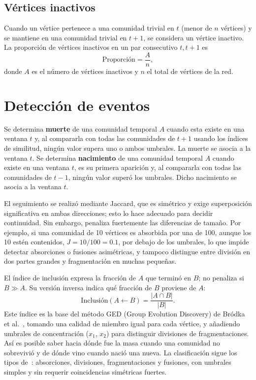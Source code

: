 \documentclass[12pt]{article}
\begin{document}
\subsection{Vértices inactivos}
Cuando un vértice pertenece a una comunidad trivial en $t$ (menor de $n$ vértices) y se mantiene en una comunidad trivial en $t+1$, se considera un vértice inactivo. La proporción de vértices inactivos en un par consecutivo $t, t+1$ es
\begin{equation}
\text{Proporción} = \frac{A}{n},
\end{equation}
donde $A$ es el número de vértices inactivos y $n$ el total de vértices de la red.

\section{Detección de eventos}
\label{sec:eventos}

Se determina \textbf{muerte} de una comunidad temporal $A$ cuando esta existe en una ventana $t$ y, al compararla con todas las comunidades de $t+1$ usando los índices de similitud, ningún valor supera uno o ambos umbrales. La muerte se asocia a la ventana $t$. Se determina \textbf{nacimiento} de una comunidad temporal $A$ cuando existe en una ventana $t$, es su primera aparición y, al compararla con todas las comunidades de $t-1$, ningún valor superó los umbrales. Dicho nacimiento se asocia a la ventana $t$.

El seguimiento se realizó mediante Jaccard, que es simétrico y exige superposición significativa en ambas direcciones; esto lo hace adecuado para decidir continuidad. Sin embargo, penaliza fuertemente las diferencias de tamaño. Por ejemplo, si una comunidad de 10 vértices es absorbida por una de 100, aunque los 10 estén contenidos, $J = 10/100 = 0.1$, por debajo de los umbrales, lo que impide detectar absorciones o fusiones asimétricas, y tampoco distingue entre división en dos partes grandes y fragmentación en muchas pequeñas.

El índice de inclusión expresa la fracción de $A$ que terminó en $B$; no penaliza si $B \gg A$. Su versión inversa indica qué fracción de $B$ proviene de $A$:
\[
\text{Inclusión}(A \leftarrow B) = \frac{|A \cap B|}{|B|}.
\]
Este índice es la base del método GED (Group Evolution Discovery) de Bródka et al.~\cite{ref:brokda}, tomando una calidad de miembro igual para cada vértice, y añadiendo umbrales de concentración ($x_1$, $x_2$) para distinguir divisiones de fragmentaciones. Así es posible saber hacia dónde fue la masa cuando una comunidad no sobrevivió y de dónde vino cuando nació una nueva. La clasificación sigue los tipos de~\cite{ref:brokda}: absorciones, divisiones, fragmentaciones y fusiones, con umbrales simples y sin requerir coincidencias simétricas fuertes.
\end{document}
